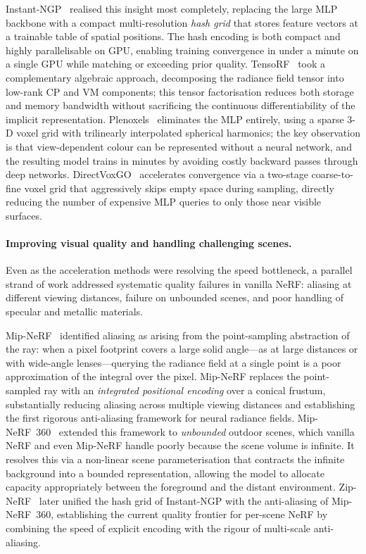 Instant-NGP~\citep{muller2022instant} realised this insight most completely,
replacing the large MLP backbone with a compact multi-resolution
\emph{hash grid} that stores feature vectors at a trainable table of spatial
positions.
The hash encoding is both compact and highly parallelisable on GPU, enabling
training convergence in under a minute on a single GPU while matching or
exceeding prior quality.
TensoRF~\citep{chen2022tensorf} took a complementary algebraic approach,
decomposing the radiance field tensor into low-rank CP and VM components;
this tensor factorisation reduces both storage and memory bandwidth without
sacrificing the continuous differentiability of the implicit representation.
Plenoxels~\citep{fridovich2022plenoxels} eliminates the MLP entirely, using
a sparse 3-D voxel grid with trilinearly interpolated spherical harmonics;
the key observation is that view-dependent colour can be represented
without a neural network, and the resulting model trains in minutes by
avoiding costly backward passes through deep networks.
DirectVoxGO~\citep{sun2022dvgo} accelerates convergence via a two-stage
coarse-to-fine voxel grid that aggressively skips empty space during sampling,
directly reducing the number of expensive MLP queries to only those near
visible surfaces.

\paragraph{Improving visual quality and handling challenging scenes.}
Even as the acceleration methods were resolving the speed bottleneck,
a parallel strand of work addressed systematic quality failures in vanilla
NeRF: aliasing at different viewing distances, failure on unbounded scenes,
and poor handling of specular and metallic materials.

Mip-NeRF~\citep{barron2021mipnerf} identified aliasing as arising from the
point-sampling abstraction of the ray: when a pixel footprint covers a large
solid angle---as at large distances or with wide-angle lenses---querying the
radiance field at a single point is a poor approximation of the integral
over the pixel.
Mip-NeRF replaces the point-sampled ray with an
\emph{integrated positional encoding} over a conical frustum, substantially
reducing aliasing across multiple viewing distances and establishing the first
rigorous anti-aliasing framework for neural radiance fields.
Mip-NeRF~360~\citep{barron2022mipnerf360} extended this framework to
\emph{unbounded} outdoor scenes, which vanilla NeRF and even Mip-NeRF handle
poorly because the scene volume is infinite.
It resolves this via a non-linear scene parameterisation that contracts the
infinite background into a bounded representation, allowing the model to
allocate capacity appropriately between the foreground and the distant environment.
Zip-NeRF~\citep{barron2023zipnerf} later unified the hash grid of Instant-NGP
with the anti-aliasing of Mip-NeRF~360, establishing the current quality
frontier for per-scene NeRF by combining the speed of explicit encoding with
the rigour of multi-scale anti-aliasing.

